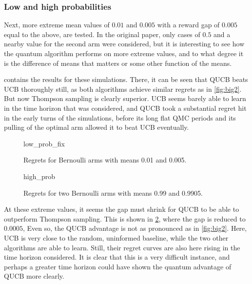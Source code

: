 \pagebreak\clearpage

\subsubsection{Low and high probabilities}
Next, more extreme mean values of $0.01$ and $0.005$ with a reward gap of $0.005$ equal to the above, are tested.
In the original paper, only cases of $0.5$ and a nearby value for the second arm were considered, but it is interesting to see how the quantum algorithm performs on more extreme values, and to what degree it is the difference of means that matters or some other function of the means.

 contains the results for these simulations.
There, it can be seen that QUCB beats UCB thoroughly still, as both algorithms achieve similar regrets as in \cref{fig:big2}.
But now Thompson sampling is clearly superior.
UCB seems barely able to learn in the time horizon that was considered, and QUCB took a substantial regret hit in the early turns of the simulations, before its long flat QMC periods and its pulling of the optimal arm allowed it to beat UCB eventually.


\begin{figure}[p]
    \centering
    \newcommand{\myoptions}{
        width=10cm,
        height=8cm,
        xlabel={Kiloturn},
        ylabel={Regret},
        legend entries={Baseline, UCB, QUCB, Thompson},
        legend pos=north west,
        legend cell align=left,
        mystyle,
    }
    {low_prob_fix}
    \caption{Regrets for Bernoulli arms with means 0.01 and 0.005.}
    \label{fig:low_prob_fix}
\end{figure}

\begin{figure}[p]
    \centering
    \newcommand{\myoptions}{
        width=10cm,
        height=8cm,
        xlabel={Kiloturn},
        ylabel={Regret},
        legend entries={Baseline, UCB, QUCB, Thompson},
        legend pos=north west,
        legend cell align=left,
        mystyle,
    }
    {high_prob}
    \caption{Regrets for two Bernoulli arms with means 0.99 and 0.9905.}
    \label{fig:high_prob}
\end{figure}

At these extreme values, it seems the gap must shrink for QUCB to be able to outperform Thompson sampling.
This is shown in \cref{fig:high_prob}, where the gap is reduced to $0.0005$,
Even so, the QUCB advantage is not as pronounced as in \cref{fig:big2}.
Here, UCB is very close to the random, uninformed baseline, while the two other algorithms are able to learn.
Still, their regret curves are also here rising in the time horizon considered.
It is clear that this is a very difficult instance, and perhaps a greater time horizon could have shown the quantum advantage of QUCB more clearly.

